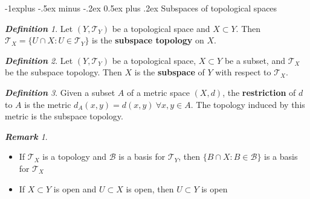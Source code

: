\documentclass[frenchspacing,9pt,landscape,a4paper]{article}
\makeatletter
\renewcommand{\subsection}{\@startsection{subsection}{2}{0mm}%
                                {-1explus -.5ex minus -.2ex}%
                                {0.5ex plus .2ex}%
                                {\normalfont\normalsize\bfseries}}
\theoremstyle{remark}
\newtheorem*{defn}{\textbf{Definition}}
\newtheorem*{rem}{\textbf{Remark}}
\makeatother
\begin{document}
\begin{multicols}{4}
\subsection{Subspaces of topological spaces}
\begin{defn}
    Let $(Y,\mathcal{T}_Y)$ be a topological space and $X\subset Y$. Then  $\mathcal{T}_X=\{U\cap
    X:U\in\mathcal{T}_Y\}$ is the \textbf{subspace topology} on $X$.
\end{defn}
\begin{defn}
    Let $(Y,\mathcal{T}_Y)$ be a topological space,  $X\subset Y$ be a subset, and  $\mathcal{T}_X$  be the
    subspace topology. Then $X$ is the  \textbf{subspace} of  $Y$ with respect to  $\mathcal{T}_X$.
\end{defn}
\begin{defn}
    Given a subset $A$ of a metric space  $(X,d)$, the \textbf{restriction} of  $d$ to  $A$ is the metric
     $d_A(x,y)=d(x,y)\ \forall x,y\in A$. The topology induced by this metric is the subspace topology.
\end{defn}
\begin{rem}
\begin{itemize}
    \item If $\mathcal{T}_X$ is a topology and  $\mathcal{B}$ is a basis for  $\mathcal{T}_Y$, then
        $\{B\cap X:B\in\mathcal{B}\}$ is a basis for  $\mathcal{T}_X$
    \item If  $X\subset Y$ is open and  $U\subset X$ is open, then  $U\subset Y$ is open
\end{itemize}    
\end{rem}

\end{multicols}
\end{document}
